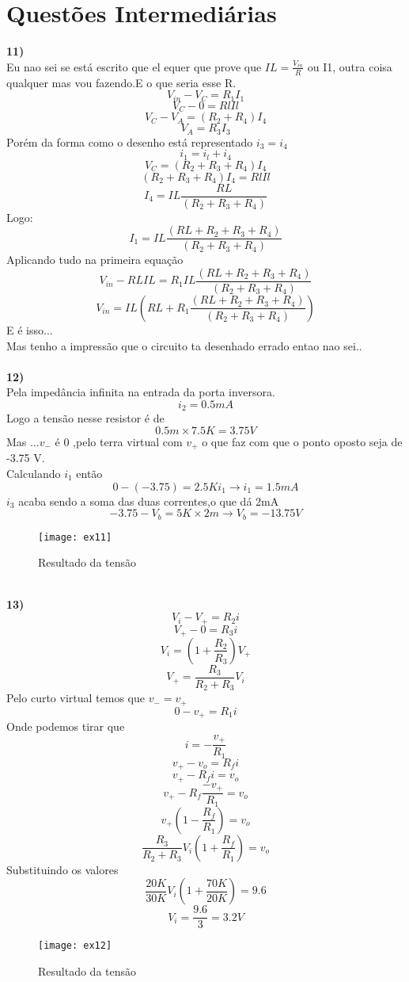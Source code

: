 \documentclass[11pt,a4paper]{article}
\begin{document}
\section*{Questões Intermediárias}
\textbf{11) }
\\
Eu nao sei se está escrito que el equer que prove que $IL=\frac{V_{in}}{R}$ ou I1, outra coisa qualquer mas vou fazendo.E o que seria esse R.
$$V_{in}-V_C=R_1I_1$$
$$V_C-0=RlIl$$
$$V_C-V_A=(R_2+R_4)I_4$$
$$V_A=R_3I_3$$
Porém da forma como o desenho está representado $i_3=i_4$
$$i_1=i_l+i_4$$
$$V_C=(R_2+R_3+R_4)I_4$$
$$(R_2+R_3+R_4)I_4=RlIl$$
$$I_4=IL\frac{RL}{(R_2+R_3+R_4)}$$
Logo:
$$I_1=IL\frac{(RL+R_2+R_3+R_4)}{(R_2+R_3+R_4)}$$
Aplicando tudo na primeira equação
$$V_{in}-RLIL=R_1IL\frac{(RL+R_2+R_3+R_4)}{(R_2+R_3+R_4)}$$
$$V_{in}=IL\left(RL+R_1\frac{(RL+R_2+R_3+R_4)}{(R_2+R_3+R_4)}\right)$$
E é isso...\\
Mas tenho a impressão que o circuito ta desenhado errado entao nao sei..\\\\
\textbf{12) }
\\
Pela impedância infinita na entrada da porta inversora. \\
$$i_2=0.5 mA$$
Logo a tensão nesse resistor é de 
$$0.5m\times 7.5K=3.75V$$
Mas ...$v_-$ é 0 ,pelo terra virtual com $v_+$ o que faz com que o ponto oposto seja de -3.75 V.\\
Calculando $i_1$ então
$$0-(-3.75)=2.5Ki_1\rightarrow i_1=1.5mA$$
$i_3$ acaba sendo a soma das duas correntes,o que dá 2mA
$$-3.75-V_b=5K\times 2m\rightarrow V_b=-13.75 V$$
\begin{figure}[!h]
\begin{center}
\texttt{[image: ex11]}
\caption{Resultado da tensão}
\end{center}
\end{figure}
\\
\newpage
\textbf{13) }
\\
$$V_i-V_+=R_2i$$
$$V_+-0=R_3i$$
$$V_i=\left(  1+\frac{R_2}{R_3}  \right)V_+$$
$$V_+=\frac{R_3}{R_2+R_3}V_i$$
Pelo curto virtual temos que $v_-=v_+$
$$0-v_+=R_1i$$
Onde podemos tirar que 
$$i=-\frac{v_+}{R_1}$$
$$v_+-v_o=R_fi$$
$$v_+-R_fi=v_o$$
$$v_+-R_f\frac{-v_+}{R_1}=v_o$$
$$v_+\left(1-\frac{R_f}{R_1}\right)=v_o$$
$$\frac{R_3}{R_2+R_3}V_i\left(1+\frac{R_f}{R_1}\right)=v_o$$
Substituindo os valores
$$\frac{20K}{30K}V_i\left( 1+\frac{70K}{20K}\right)=9.6$$
$$V_i=\frac{9.6}{3}=3.2V$$
\begin{figure}[!h]
\begin{center}
\texttt{[image: ex12]}
\caption{Resultado da tensão}
\end{center}
\end{figure}
\end{document}
